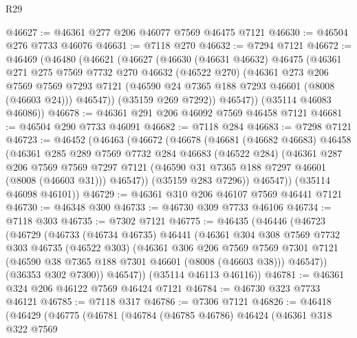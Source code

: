 \begin{lexlean}{R29}
\begin{coremodule}
@46627 := @46361 @277 @206 @46077 @7569 @46475 @7121
@46630 := @46504 @276 @7733 @46076
@46631 := @7118 @270
@46632 := @7294 @7121
@46672 := @46469
    (@46480
      (@46621
        (@46627
          (@46630
            (@46631 @46632)
            @46475
            (@46361
              @271
              @275
              @7569
              @7732
              @270
              @46632
              (@46522 @270)
              (@46361
                @273
                @206
                @7569
                @7569
                @7293
                @7121
                (@46590 @24 @7365 @188 @7293 @46601 (@8008 (@46603 @24)))
                @46547))
            (@35159 @269 @7292))
          @46547))
      (@35114 @46083 @46086))
@46678 := @46361 @291 @206 @46092 @7569 @46458 @7121
@46681 := @46504 @290 @7733 @46091
@46682 := @7118 @284
@46683 := @7298 @7121
@46723 := @46452
    (@46463
      (@46672
        (@46678
          (@46681
            (@46682 @46683)
            @46458
            (@46361
              @285
              @289
              @7569
              @7732
              @284
              @46683
              (@46522 @284)
              (@46361
                @287
                @206
                @7569
                @7569
                @7297
                @7121
                (@46590 @31 @7365 @188 @7297 @46601 (@8008 (@46603 @31)))
                @46547))
            (@35159 @283 @7296))
          @46547))
      (@35114 @46098 @46101))
@46729 := @46361 @310 @206 @46107 @7569 @46441 @7121
@46730 := @46348 @300
@46733 := @46730 @309 @7733 @46106
@46734 := @7118 @303
@46735 := @7302 @7121
@46775 := @46435
    (@46446
      (@46723
        (@46729
          (@46733
            (@46734 @46735)
            @46441
            (@46361
              @304
              @308
              @7569
              @7732
              @303
              @46735
              (@46522 @303)
              (@46361
                @306
                @206
                @7569
                @7569
                @7301
                @7121
                (@46590 @38 @7365 @188 @7301 @46601 (@8008 (@46603 @38)))
                @46547))
            (@36353 @302 @7300))
          @46547))
      (@35114 @46113 @46116))
@46781 := @46361 @324 @206 @46122 @7569 @46424 @7121
@46784 := @46730 @323 @7733 @46121
@46785 := @7118 @317
@46786 := @7306 @7121
@46826 := @46418
    (@46429
      (@46775
        (@46781
          (@46784
            (@46785 @46786)
            @46424
            (@46361
              @318
              @322
              @7569

\end{coremodule}
\end{lexlean}
